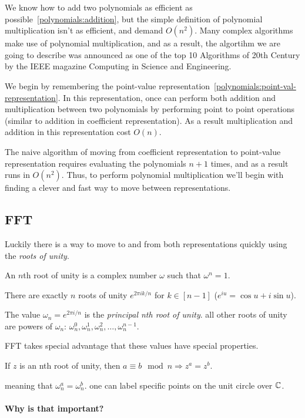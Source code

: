We know how to add two polynomials as efficient as possible~\ref{polynomials:addition},
but the simple definition of polynomial multiplication isn't as efficient, and demand $O(n^2)$.
Many complex algorithms make use of polynomial multiplication, and as a result, the algortihm 
we are going to describe was announced as one of the top 10 Algorithms of 20th
Century by the IEEE magazine Computing in Science and Engineering.\cite{814652}


We begin by remembering the point-value representation~\ref{polynomials:point-val-representation}.
In this representation, once can perform both addition and multiplication between two polynomials 
by performing point to point operations (similar to addition in coefficient representation).
As a result multiplication and addition in this representation cost $O(n)$.


The naive algorithm of moving from coefficient representation to point-value representation
requires evaluating the polynomials $n+1$ times, and as a result runs in $O(n^2)$.
Thus, to perform polynomial multiplication we'll begin with finding a clever and fast way to move between representations.
\subsection{FFT}
Luckily there is a way to move to and from both representations quickly using the \emph{roots of unity}.

\begin{defn}
An $n$th root of unity is a complex number $\omega$ such that
$\omega^n =1$.
\end{defn}

There are exactly $n$ roots of unity $e^{2\pi i k/n}$ for $k\in[n-1]$ 
($e^{iu}= \cos{u}+i \sin{u}$).

The value $\omega_n=e^{2\pi i/n}$ is the \emph{principal nth root of unity}.
all other roots of unity are powers of $\omega_n$:
 $\omega_n^0, \omega_n^1, \omega_n^2,\dots, \omega_n^{n-1}$.

FFT takes special advantage that these values have special properties.
\begin{lemma}\label{roots-of-unity-property}
If $z$ is an nth root of unity, then $ a \equiv b \mod n \Rightarrow z^a = z^b$.
\end{lemma}
meaning that $\omega_n^a = \omega_n^b$. one can label specific points on the unit circle over $\mathbb{C}$.

\paragraph{Why is that important?}

